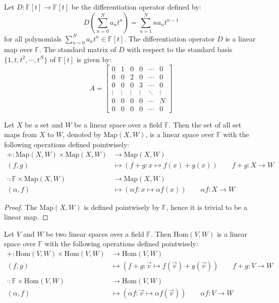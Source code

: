 \documentclass[
	11pt, %
	fleqn, %
	a4paper, %
]{LegrandOrangeBook}
\newcommand{\Hom}[2]{\text{Hom}(#1, #2)} %
\newcommand{\F}{\mathbb{F}} %
\newcommand{\Map}[2]{\text{Map}(#1, #2)} %
\begin{document}
\begin{example}
    Let $D: \F[t] \to \F[t]$ be the differentiation operator defined by:
    \[
        D\left( \sum_{n=0}^{N} a_n t^n \right) = \sum_{n=1}^{N} n a_n t^{n-1}
    \]
    for all polynomials $\sum_{n=0}^{N} a_n t^n \in \F[t]$. The differentiation operator $D$ is a linear map over $\F$. The standard matrix of $D$ with respect to the standard basis $\{1, t, t^2, \cdots, t^N\}$ of $\F[t]$ is given by:
    \[
        A = \begin{bmatrix}
            0 & 1 & 0 & 0 & \cdots & 0 \\
            0 & 0 & 2 & 0 & \cdots & 0 \\
            0 & 0 & 0 & 3 & \cdots & 0 \\
            \vdots & \vdots & \vdots & \vdots & \ddots & \vdots \\
            0 & 0 & 0 & 0 & \cdots & N \\
            0 & 0 & 0 & 0 & \cdots & 0
        \end{bmatrix}
    \]
\end{example}

\begin{proposition}
    Let $X$ be a set and $W$ be a linear space over a field $\F$. Then the set of all set maps from $X$ to $W$, denoted by $\Map{X}{W}$, is a linear space over $\F$ with the following operations defined pointwisely:
    \[
        \begin{split}
            + : \Map{X}{W} \times \Map{X}{W} &\to \Map{X}{W} \\
            (f,g) &\mapsto (f+g: x \mapsto f(x) + g(x)) \qquad f + g : X \to W \\ \\
            \cdot : \F \times \Map{X}{W} &\to \Map{X}{W} \\
            (\alpha,f) &\mapsto (\alpha f: x \mapsto \alpha f(x)) \qquad \alpha f : X \to W
        \end{split}
    \]
\end{proposition}

\begin{proof}
    The $\Map{X}{W}$ is defined pointwisely by $\F$, hence it is trivial to be a linear map.
\end{proof}

\begin{proposition}
    Let $V$ and $W$ be two linear spaces over a field $\F$. Then $\Hom{V}{W}$ is a linear space over $\F$ with the following operations defined pointwisely:
    \[
        \begin{split}
            + : \Hom{V}{W} \times \Hom{V}{W} &\to \Hom{V}{W} \\
            (f,g) &\mapsto (f+g: \vec{v} \mapsto f(\vec{v}) + g(\vec{v})) \qquad f + g : V \to W \\ \\
            \cdot : \F \times \Hom{V}{W} &\to \Hom{V}{W} \\
            (\alpha,f) &\mapsto (\alpha f: \vec{v} \mapsto \alpha f(\vec{v})) \qquad \alpha f : V \to W
        \end{split}
    \]
\end{proposition}
\end{document}
